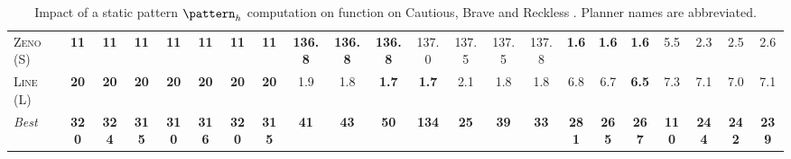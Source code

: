 \begin{table}[tb]
{\begin{tabular}{|l||ccccccc||ccccccc||ccccccc||}
\textsc{Zeno} (S)&\textbf{11}&\textbf{11}&\textbf{11}&\textbf{11}&\textbf{11}&\textbf{11}&\textbf{11}&\textbf{136.8}&\textbf{136.8}&\textbf{136.8}&137.0&137.5&137.5&137.8&\textbf{1.6}&\textbf{1.6}&\textbf{1.6}&5.5&2.3&2.5&2.6\\
\textsc{Line} (L)&\textbf{20}&\textbf{20}&\textbf{20}&\textbf{20}&\textbf{20}&\textbf{20}&\textbf{20}&1.9&1.8&\textbf{1.7}&\textbf{1.7}&2.1&1.8&1.8&6.8&6.7&\textbf{6.5}&7.3&7.1&7.0&7.1
\\\hline
\textit{Best}&\textbf{320}&\textbf{324}&\textbf{315}&\textbf{310}&\textbf{316}&\textbf{320}&\textbf{315}&\textbf{41}&\textbf{43}&\textbf{50}&\textbf{134}&\textbf{25}&\textbf{39}&\textbf{33}&\textbf{281}&\textbf{265}&\textbf{267}&\textbf{110}&\textbf{244}&\textbf{242}&\textbf{239}\\\hline

        \end{tabular}}
        \caption{Impact of a static pattern $\pattern_h$ computation on function on Cautious, Brave and Reckless \pattyd. Planner names are abbreviated.}
        \label{tab:abl-patternh-static}
        \end{table}
        
